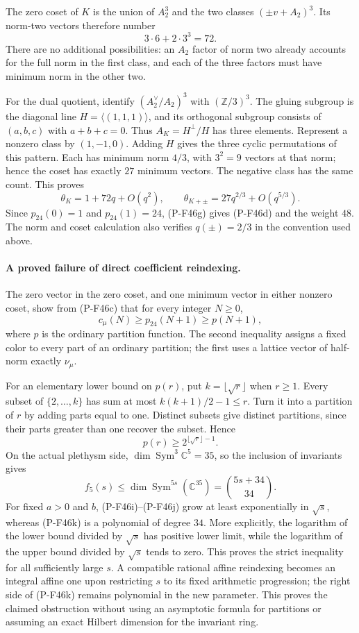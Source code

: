 \documentclass[11pt,a4paper]{article}
\begin{document}
The zero coset of $K$ is the union of $A_2^3$ and
the two classes $(\pm v+A_2)^3$. Its norm-two
vectors therefore number
\[
                         3\cdot6+2\cdot3^3=72.
\]
There are no additional possibilities: an $A_2$
factor of norm two already accounts for the full
norm in the first class, and each of the three
factors must have minimum norm in the other two.

For the dual quotient, identify
$(A_2^\vee/A_2)^3$ with $(\mathbb Z/3)^3$.
The gluing subgroup is the diagonal line
$H=\langle(1,1,1)\rangle$, and its orthogonal
subgroup consists of $(a,b,c)$ with $a+b+c=0$.
Thus $A_K=H^\perp/H$ has three elements.
Represent a nonzero class by $(1,-1,0)$.
Adding $H$ gives the three cyclic permutations
of this pattern. Each has minimum norm $4/3$,
with $3^2=9$ vectors at that norm; hence the
coset has exactly $27$ minimum vectors.
The negative class has the same count. This proves
\[
 \theta_K=1+72q+O(q^2),\qquad
 \theta_{K+\pm}=27q^{2/3}+O(q^{5/3}).
 \tag{P-F46g}
\]
Since $p_{24}(0)=1$ and $p_{24}(1)=24$,
(P-F46g) gives (P-F46d) and the weight $48$.
The norm and coset calculation also verifies
$q(\pm)=2/3$ in the convention used above.

\paragraph{A proved failure of direct coefficient reindexing.}
The zero vector in the zero coset, and one minimum vector
in either nonzero coset, show from (P-F46c) that for
every integer $N\ge0$,
\[
                         c_\mu(N)\ge p_{24}(N+1)
                                            \ge p(N+1),
 \tag{P-F46i}
\]
where $p$ is the ordinary partition function. The second
inequality assigns a fixed color to every part of an
ordinary partition; the first uses a lattice vector
of half-norm exactly $\nu_\mu$.

For an elementary lower bound on $p(r)$, put
$k=\lfloor\sqrt r\rfloor$ when $r\ge1$.
Every subset of $\{2,\ldots,k\}$ has sum at most
$k(k+1)/2-1\le r$. Turn it into a partition of $r$
by adding parts equal to one. Distinct subsets give
distinct partitions, since their parts greater than
one recover the subset. Hence
\[
                         p(r)\ge2^{\lfloor\sqrt r\rfloor-1}.
 \tag{P-F46j}
\]
On the actual plethysm side, $\dim\operatorname{Sym}^3
\mathbb C^5=35$, so the inclusion of invariants gives
\[
       f_5(s)\le
       \dim\operatorname{Sym}^{5s}(\mathbb C^{35})
                       =\binom{5s+34}{34}.
 \tag{P-F46k}
\]
For fixed $a>0$ and $b$, (P-F46i)--(P-F46j) grow at
least exponentially in $\sqrt s$, whereas (P-F46k)
is a polynomial of degree $34$. More explicitly,
the logarithm of the lower bound divided by $\sqrt s$
has positive lower limit, while the logarithm of the
upper bound divided by $\sqrt s$ tends to zero.
This proves the strict inequality for all sufficiently
large $s$. A compatible rational affine reindexing
becomes an integral affine one upon restricting $s$
to its fixed arithmetic progression; the right side
of (P-F46k) remains polynomial in the new parameter.
This proves the claimed obstruction without using
an asymptotic formula for partitions or assuming
an exact Hilbert dimension for the invariant ring.
\end{document}
